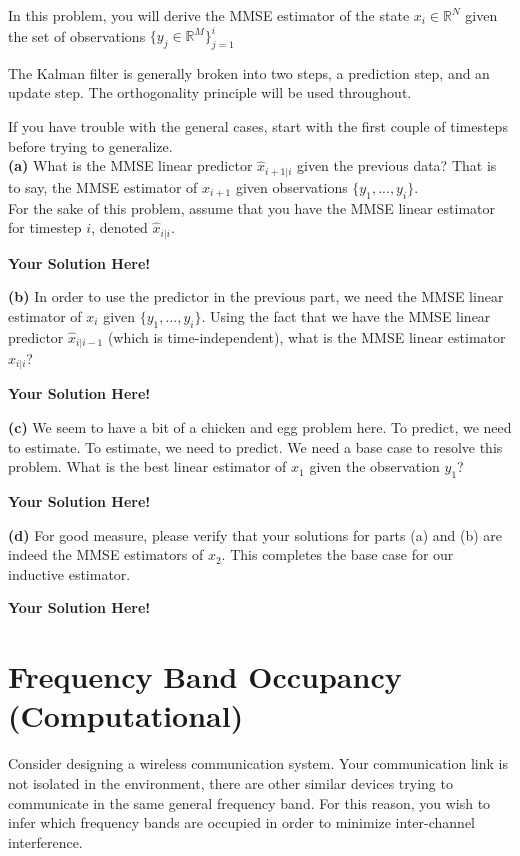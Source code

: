 \documentclass[12pt]{article}
\newcommand{\0}{\mathbf{0}}
\newcommand{\1}{\mathbf{1}}
\newcommand{\solspace}{\vspace{3mm} \textbf{Your Solution Here!} \vspace{3mm}}
\begin{document}
In this problem, you will derive the MMSE estimator of the state $x_i \in \mathbb{R}^N$ given the set of observations $\{y_j \in \mathbb{R}^M\}_{j=1}^{i}$ 

The Kalman filter is generally broken into two steps, a prediction step, and an update step.
The orthogonality principle will be used throughout.

If you have trouble with the general cases, start with the first couple of timesteps before trying to generalize. \\

\textbf{(a)} What is the MMSE linear predictor $\hat{x}_{i+1|i}$ given the previous data? That is to say, the MMSE estimator of $x_{i+1}$ given observations $\{y_1,...,y_i\}$.\\
For the sake of this problem, assume that you have the MMSE linear estimator for timestep $i$, denoted $\hat{x}_{i|i}$.

\solspace

\textbf{(b)} In order to use the predictor in the previous part, we need the MMSE linear estimator of $x_i$ given $\{y_1,...,y_i\}$. Using the fact that we have the MMSE linear predictor $\hat{x}_{i|i-1}$ (which is time-independent), what is the MMSE linear estimator $\hat{x}_{i|i}$?

\solspace

\textbf{(c)} We seem to have a bit of a chicken and egg problem here. To predict, we need to estimate. To estimate, we need to predict.
We need a base case to resolve this problem.
What is the best linear estimator of $x_1$ given the observation $y_1$?

\solspace

\textbf{(d)} For good measure, please verify that your solutions for parts (a) and (b) are indeed the MMSE estimators of $x_2$. 
This completes the base case for our inductive estimator.

\solspace



\pagebreak
\section{Frequency Band Occupancy (Computational)}
Consider designing a wireless communication system.
Your communication link is not isolated in the environment, there are other similar devices trying to communicate in the same general frequency band.
For this reason, you wish to infer which frequency bands are occupied in order to minimize inter-channel interference.
\end{document}
